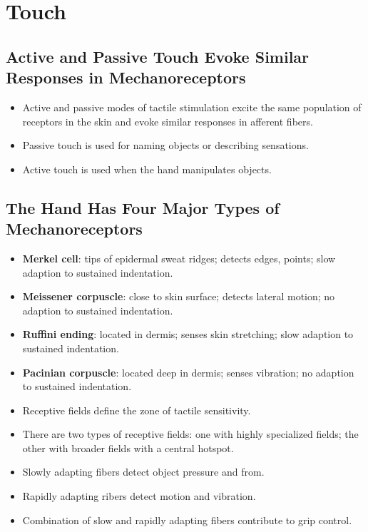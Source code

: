 \documentclass[12pt,a4paper]{article}
\begin{document}
\section{Touch}
\subsection{Active and Passive Touch Evoke Similar Responses in Mechanoreceptors}
\begin{itemize}
    \item Active and passive modes of tactile stimulation excite the same population of receptors in the skin and evoke similar responses in afferent fibers.
    \item Passive touch is used for naming objects or describing sensations.
    \item Active touch is used when the hand manipulates objects.
\end{itemize}

\subsection{The Hand Has Four Major Types of Mechanoreceptors}
\begin{itemize}
    \item \textbf{Merkel cell}: tips of epidermal sweat ridges; detects edges, points; slow adaption to sustained indentation.
    \item \textbf{Meissener corpuscle}: close to skin surface; detects lateral motion; no adaption to sustained indentation.
    \item \textbf{Ruffini ending}: located in dermis; senses skin stretching; slow adaption to sustained indentation.
    \item \textbf{Pacinian corpuscle}: located deep in dermis; senses vibration; no adaption to sustained indentation. 
    \item Receptive fields define the zone of tactile sensitivity.
    \item There are two types of receptive fields: one with highly specialized fields; the other with broader fields with a central hotspot.
    \item Slowly adapting fibers detect object pressure and from.
    \item Rapidly adapting ribers detect motion and vibration.
    \item Combination of slow and rapidly adapting fibers contribute to grip control.
\end{itemize}
\end{document}
